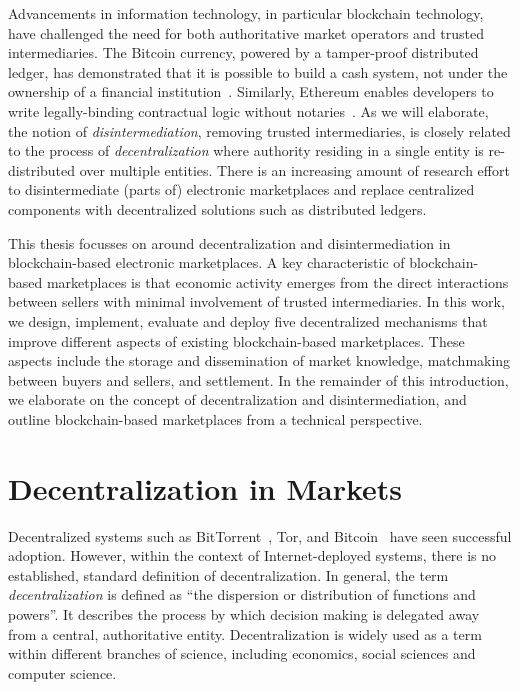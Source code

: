 Advancements in information technology, in particular blockchain technology, have challenged the need for both authoritative market operators and trusted intermediaries.
The Bitcoin currency, powered by a tamper-proof distributed ledger, has demonstrated that it is possible to build a cash system, not under the ownership of a financial institution~\cite{nakamoto2008bitcoin}.
Similarly, Ethereum enables developers to write legally-binding contractual logic without notaries~\cite{wood2014ethereum}.
As we will elaborate, the notion of \emph{disintermediation}, removing trusted intermediaries, is closely related to the process of \emph{decentralization} where authority residing in a single entity is re-distributed over multiple entities.
There is an increasing amount of research effort to disintermediate (parts of) electronic marketplaces and replace centralized components with decentralized solutions such as distributed ledgers.

This thesis focusses on around decentralization and disintermediation in blockchain-based electronic marketplaces.
A key characteristic of blockchain-based marketplaces is that economic activity emerges from the direct interactions between sellers with minimal involvement of trusted intermediaries.
In this work, we design, implement, evaluate and deploy five decentralized mechanisms that improve different aspects of existing blockchain-based marketplaces.
These aspects include the storage and dissemination of market knowledge, matchmaking between buyers and sellers, and settlement.
In the remainder of this introduction, we elaborate on the concept of decentralization and disintermediation, and outline blockchain-based marketplaces from a technical perspective.

\section{Decentralization in Markets}
Decentralized systems such as BitTorrent~\cite{pouwelse2005bittorrent}, Tor, and Bitcoin~\cite{nakamoto2008bitcoin} have seen successful adoption.
However, within the context of Internet-deployed systems, there is no established, standard definition of decentralization.
In general, the term \emph{decentralization} is defined as \enquote{the dispersion or distribution of functions and powers}.
It describes the process by which decision making is delegated away from a central, authoritative entity.
Decentralization is widely used as a term within different branches of science, including economics, social sciences and computer science.

